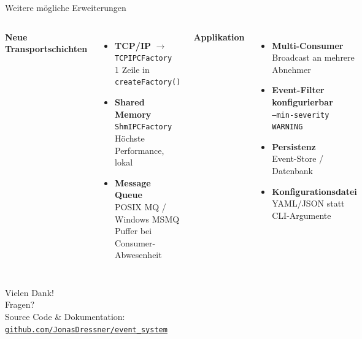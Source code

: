 \documentclass{beamer}
\begin{document}
\begin{frame}{Weitere mögliche Erweiterungen}
\begin{columns}[T]
    \textbf{Neue Transportschichten}
    \begin{itemize}
        \item \textbf{TCP/IP} $\rightarrow$ \texttt{TCPIPCFactory}\\
              1 Zeile in \texttt{createFactory()}
        \item \textbf{Shared Memory}\\
              \texttt{ShmIPCFactory}\\
              Höchste Performance, lokal
        \item \textbf{Message Queue}\\
              POSIX MQ / Windows MSMQ\\
              Puffer bei Consumer-Abwesenheit
    \end{itemize}

    \textbf{Applikation}
    \begin{itemize}
        \item \textbf{Multi-Consumer}\\
              Broadcast an mehrere Abnehmer
        \item \textbf{Event-Filter konfigurierbar}\\
              \texttt{--min-severity WARNING}
        \item \textbf{Persistenz}\\
              Event-Store / Datenbank
        \item \textbf{Konfigurationsdatei}\\
              YAML/JSON statt CLI-Argumente
    \end{itemize}
\end{columns}
\end{frame}

\begin{frame}
    \centering
    \vspace{2em}
    {\Huge Vielen Dank!}\\[1.5em]
    {\large Fragen?}\\[2em]
    \small Source Code \& Dokumentation:\\[0.3em]
    \href{https://github.com/JonasDressner/event_system}{\texttt{github.com/JonasDressner/event\_system}}
\end{frame}
\end{document}
